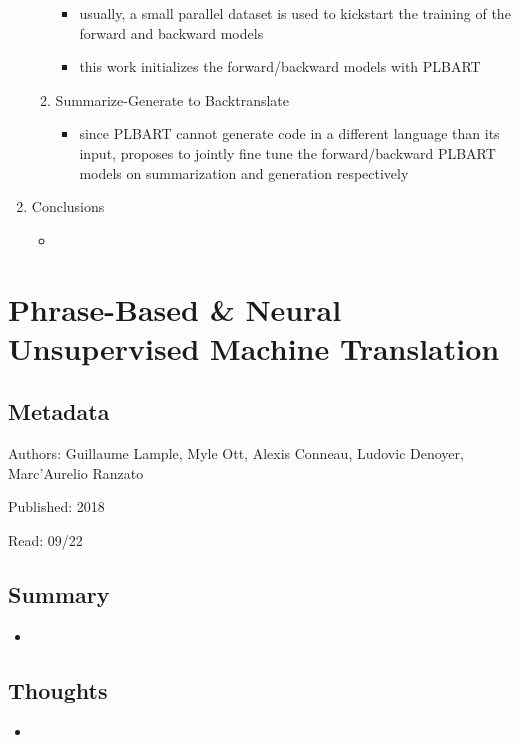 \documentclass{article}
\begin{document}
\begin{enumerate}
\begin{enumerate}
\begin{itemize}
			\item usually, a small parallel dataset is used to kickstart the training of the forward and backward models
			\item this work initializes the forward/backward models with PLBART
		\end{itemize}
		\item Summarize-Generate to Backtranslate
		\begin{itemize}
			\item since PLBART cannot generate code in a different language than its input, proposes to jointly fine tune the forward/backward PLBART models on summarization and generation respectively
		\end{itemize}
	\end{enumerate}
	\item Conclusions
	\begin{itemize}
		\item 
	\end{itemize}
\end{enumerate}

\pagebreak


\section*{Phrase-Based \& Neural Unsupervised Machine Translation}

\subsection*{Metadata}

\noindent Authors: Guillaume Lample, Myle Ott, Alexis Conneau, Ludovic Denoyer, Marc'Aurelio Ranzato

\noindent Published: 2018

\noindent Read: 09/22

\subsection*{Summary}
\begin{itemize}
	\item
\end{itemize}

\subsection*{Thoughts}
\begin{itemize}
	\item
\end{itemize}
\end{document}
